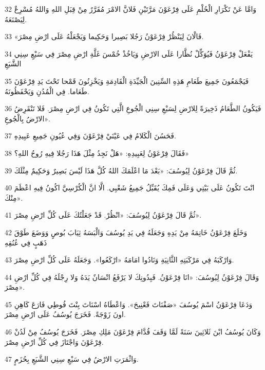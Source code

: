 \par 32 وَامَّا عَنْ تَكْرَارِ الْحُلْمِ عَلَى فِرْعَوْنَ مَرَّتَيْنِ فَلانَّ الامْرَ مُقَرَّرٌ مِنْ قِبَلِ اللهِ وَاللهُ مُسْرِعٌ لِيَصْنَعَهُ.
\par 33 «فَالْانَ لِيَنْظُرْ فِرْعَوْنُ رَجُلا بَصِيرا وَحَكِيما وَيَجْعَلْهُ عَلَى ارْضِ مِصْرَ.
\par 34 يَفْعَلْ فِرْعَوْنُ فَيُوَكِّلْ نُظَّارا عَلَى الارْضِ وَيَاخُذْ خُمْسَ غَلَّةِ ارْضِ مِصْرَ فِي سَبْعِ سِنِي الشَّبَعِ
\par 35 فَيَجْمَعُونَ جَمِيعَ طَعَامِ هَذِهِ السِّنِينَ الْجَيِّدَةِ الْقَادِمَةِ وَيَخْزِنُونَ قَمْحا تَحْتَ يَدِ فِرْعَوْنَ طَعَاما. فِي الْمُدُنِ وَيَحْفَظُونَهُ.
\par 36 فَيَكُونُ الطَّعَامُ ذَخِيرَةً لِلارْضِ لِسَبْعِ سِنِي الْجُوعِ الَّتِي تَكُونُ فِي ارْضِ مِصْرَ. فَلا تَنْقَرِضُ الارْضُ بِالْجُوعِ».
\par 37 فَحَسُنَ الْكَلامُ فِي عَيْنَيْ فِرْعَوْنَ وَفِي عُيُونِ جَمِيعِ عَبِيدِهِ.
\par 38 فَقَالَ فِرْعَوْنُ لِعَبِيدِهِ: «هَلْ نَجِدُ مِثْلَ هَذَا رَجُلا فِيهِ رُوحُ اللهِ؟»
\par 39 ثُمَّ قَالَ فِرْعَوْنُ لِيُوسُفَ: «بَعْدَ مَا اعْلَمَكَ اللهُ كُلَّ هَذَا لَيْسَ بَصِيرٌ وَحَكِيمٌ مِثْلَكَ.
\par 40 انْتَ تَكُونُ عَلَى بَيْتِي وَعَلَى فَمِكَ يُقَبِّلُ جَمِيعُ شَعْبِي. الَّا انَّ الْكُرْسِيَّ اكُونُ فِيهِ اعْظَمَ مِنْكَ».
\par 41 ثُمَّ قَالَ فِرْعَوْنُ لِيُوسُفَ: «انْظُرْ. قَدْ جَعَلْتُكَ عَلَى كُلِّ ارْضِ مِصْرَ».
\par 42 وَخَلَعَ فِرْعَوْنُ خَاتِمَهُ مِنْ يَدِهِ وَجَعَلَهُ فِي يَدِ يُوسُفَ وَالْبَسَهُ ثِيَابَ بُوصٍ وَوَضَعَ طَوْقَ ذَهَبٍ فِي عُنُقِهِ
\par 43 وَارْكَبَهُ فِي مَرْكَبَتِهِ الثَّانِيَةِ وَنَادُوا امَامَهُ «ارْكَعُوا». وَجَعَلَهُ عَلَى كُلِّ ارْضِ مِصْرَ.
\par 44 وَقَالَ فِرْعَوْنُ لِيُوسُفَ: «انَا فِرْعَوْنُ. فَبِدُونِكَ لا يَرْفَعُ انْسَانٌ يَدَهُ وَلا رِجْلَهُ فِي كُلِّ ارْضِ مِصْرَ».
\par 45 وَدَعَا فِرْعَوْنُ اسْمَ يُوسُفَ «صَفْنَاتَ فَعْنِيحَ». وَاعْطَاهُ اسْنَاتَ بِنْتَ فُوطِي فَارَعَ كَاهِنِ اونَ زَوْجَةً. فَخَرَجَ يُوسُفُ عَلَى ارْضِ مِصْرَ.
\par 46 وَكَانَ يُوسُفُ ابْنَ ثَلاثِينَ سَنَةً لَمَّا وَقَفَ قُدَّامَ فِرْعَوْنَ مَلِكِ مِصْرَ. فَخَرَجَ يُوسُفُ مِنْ لَدُنْ فِرْعَوْنَ وَاجْتَازَ فِي كُلِّ ارْضِ مِصْرَ.
\par 47 وَاثْمَرَتِ الارْضُ فِي سَبْعِ سِنِي الشَّبَعِ بِحُزَمٍ.
